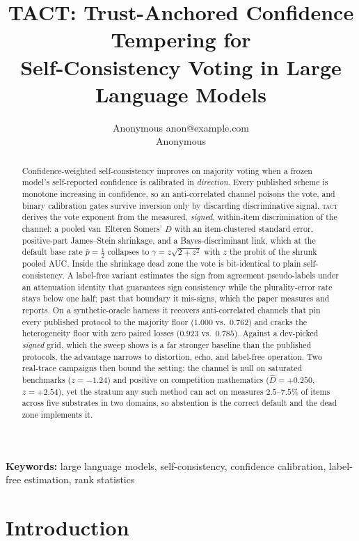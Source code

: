 \documentclass{article}
\title{TACT: Trust-Anchored Confidence Tempering for\\ Self-Consistency Voting
in Large Language Models}
\author{\name Anonymous \email anon@example.com \\ \addr Anonymous}
\newcommand{\Dhat}{\widehat{D}}
\newcommand{\TACT}{\textsc{tact}}
\begin{document}
\maketitle
\begin{abstract}
Confidence-weighted self-consistency improves on majority voting when a frozen
model's self-reported confidence is calibrated in \emph{direction}. Every
published scheme is monotone increasing in confidence, so an anti-correlated
channel poisons the vote, and binary calibration gates survive inversion only
by discarding discriminative signal. \TACT{} derives the vote exponent from the
measured, \emph{signed}, within-item discrimination of the channel: a pooled
van~Elteren Somers' $D$ with an item-clustered standard error, positive-part
James--Stein shrinkage, and a Bayes-discriminant link, which at the default
base rate $\bar p=\tfrac12$ collapses to $\gamma=z\sqrt{2+z^2}$ with $z$ the
probit of the shrunk pooled AUC. Inside the shrinkage dead zone the vote is
bit-identical to plain self-consistency. A label-free variant estimates the
sign from agreement pseudo-labels under an attenuation identity that
guarantees sign consistency while the plurality-error rate stays below one
half; past that boundary it mis-signs, which the paper measures and reports.
On a synthetic-oracle harness it recovers anti-correlated channels that pin
every published protocol to the majority floor ($1.000$ vs.\ $0.762$) and
cracks the heterogeneity floor with zero paired losses ($0.923$ vs.\ $0.785$).
Against a dev-picked \emph{signed} grid, which the sweep shows is a far
stronger baseline than the published protocols, the advantage narrows to
distortion, echo, and label-free operation. Two real-trace campaigns then
bound the setting: the channel is null on saturated benchmarks
($z=-1.24$) and positive on competition mathematics ($\Dhat=+0.250$,
$z=+2.54$), yet the stratum any such method can act on measures $2.5$--$7.5\%$
of items across five substrates in two domains, so abstention is the correct
default and the dead zone implements it.
\end{abstract}

\noindent\textbf{Keywords:} 
large language models, self-consistency, confidence calibration, label-free estimation, rank statistics


\section{Introduction}
\end{document}
